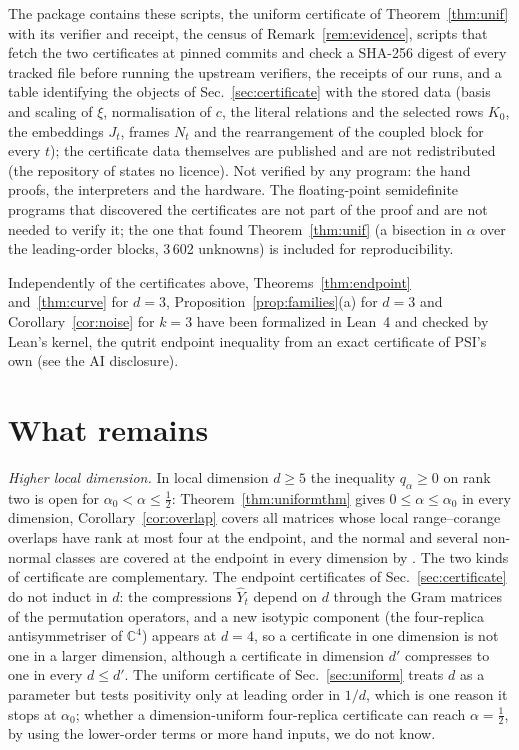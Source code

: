\documentclass[aps,pra,twocolumn,superscriptaddress,nofootinbib,longbibliography]{revtex4-2}
\newcommand{\C}{\mathbb C}
\newcommand{\Yh}{\widehat Y}
\theoremstyle{plain}
\theoremstyle{definition}
\theoremstyle{remark}
\begin{document}
The package \cite{Pkg} contains these scripts, the uniform certificate of Theorem~\ref{thm:unif} with its verifier and receipt, the census of Remark~\ref{rem:evidence}, scripts that fetch the two certificates at pinned commits and check a SHA-256 digest of every tracked file before running the upstream verifiers, the receipts of our runs, and a table identifying the objects of Sec.~\ref{sec:certificate} with the stored data (basis and scaling of $\xi$, normalisation of $c$, the literal relations and the selected rows $K_0$, the embeddings $J_t$, frames $N_t$ and the rearrangement of the coupled block for every $t$); the certificate data themselves are published \cite{Zenodo,Liu} and are not redistributed (the repository of \cite{Liu} states no licence). Not verified by any program: the hand proofs, the interpreters and the hardware. The floating-point semidefinite programs that discovered the certificates are not part of the proof and are not needed to verify it; the one that found Theorem~\ref{thm:unif} (a bisection in $\alpha$ over the leading-order blocks, 3\,602 unknowns) is included for reproducibility.

Independently of the certificates above, Theorems~\ref{thm:endpoint} and~\ref{thm:curve} for $d=3$, Proposition~\ref{prop:families}(a) for $d=3$ and Corollary~\ref{cor:noise} for $k=3$ have been formalized in Lean~4 and checked by Lean's kernel, the qutrit endpoint inequality from an exact certificate of PSI's own (see the AI disclosure).

\section{What remains}\label{sec:discussion}

\emph{Higher local dimension.} In local dimension $d\ge5$ the inequality $q_\alpha\ge0$ on rank two is open for $\alpha_0<\alpha\le\tfrac12$: Theorem~\ref{thm:uniformthm} gives $0\le\alpha\le\alpha_0$ in every dimension, Corollary~\ref{cor:overlap} covers all matrices whose local range--corange overlaps have rank at most four at the endpoint, and the normal and several non-normal classes are covered at the endpoint in every dimension by \cite{WuZou}. The two kinds of certificate are complementary. The endpoint certificates of Sec.~\ref{sec:certificate} do not induct in $d$: the compressions $\Yh_t$ depend on $d$ through the Gram matrices of the permutation operators, and a new isotypic component (the four-replica antisymmetriser of $\C^4$) appears at $d=4$, so a certificate in one dimension is not one in a larger dimension, although a certificate in dimension $d'$ compresses to one in every $d\le d'$. The uniform certificate of Sec.~\ref{sec:uniform} treats $d$ as a parameter but tests positivity only at leading order in $1/d$, which is one reason it stops at $\alpha_0$; whether a dimension-uniform four-replica certificate can reach $\alpha=\tfrac12$, by using the lower-order terms or more hand inputs, we do not know.
\end{document}
